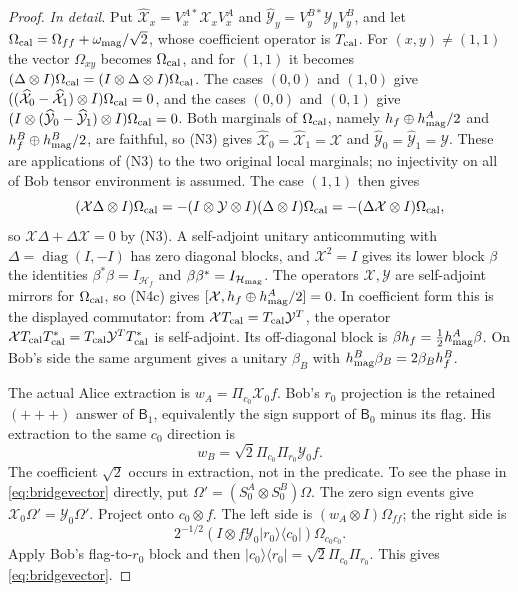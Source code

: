 \begin{proof}
\emph{In detail.} Put $\widehat{\mathcal X}_x=V^{A*}_x\mathcal X_xV^A_x$ and $\widehat{\mathcal Y}_y=V^{B*}_y\mathcal Y_yV^B_y$, and let $\Omega_{\rm cal}=\Omega_{ff}+\omega_{\rm mag}/\sqrt2$, whose coefficient operator is $T_{\rm cal}$. For $(x,y)\ne(1,1)$ the vector $\Omega_{xy}$ becomes $\Omega_{\rm cal}$, and for $(1,1)$ it becomes $(\Delta\otimes I)\Omega_{\rm cal}=(I\otimes\Delta\otimes I)\Omega_{\rm cal}$. The cases $(0,0)$ and $(1,0)$ give $((\widehat{\mathcal X}_0-\widehat{\mathcal X}_1)\otimes I)\Omega_{\rm cal}=0$, and the cases $(0,0)$ and $(0,1)$ give $(I\otimes(\widehat{\mathcal Y}_0-\widehat{\mathcal Y}_1)\otimes I)\Omega_{\rm cal}=0$. Both marginals of $\Omega_{\rm cal}$, namely $h_f\oplus h^A_{\rm mag}/2$ and $h^B_f\oplus h^B_{\rm mag}/2$, are faithful, so (N3) gives $\widehat{\mathcal X}_0=\widehat{\mathcal X}_1=\mathcal X$ and $\widehat{\mathcal Y}_0=\widehat{\mathcal Y}_1=\mathcal Y$. These are applications of (N3) to the two original local marginals;
no injectivity on all of Bob tensor environment is assumed. The case $(1,1)$ then gives
\[
 (\mathcal X\Delta\otimes I)\Omega_{\rm cal}=-(I\otimes\mathcal Y\otimes I)(\Delta\otimes I)\Omega_{\rm cal}
 =-(\Delta\mathcal X\otimes I)\Omega_{\rm cal},
\]
so $\mathcal X\Delta+\Delta\mathcal X=0$ by (N3). A self-adjoint unitary anticommuting with $\Delta=\operatorname{diag}(I,-I)$ has zero diagonal blocks, and $\mathcal X^2=I$ gives its lower block $\beta$ the identities $\beta^*\beta=I_{\mathcal H_f}$ and $\beta\beta^*=I_{\mathcal H_{\rm mag}}$. The operators $\mathcal X,\mathcal Y$ are self-adjoint mirrors for $\Omega_{\rm cal}$, so (N4c) gives $[\mathcal X,h_f\oplus h^A_{\rm mag}/2]=0$. In coefficient form this is the displayed commutator: from $\mathcal XT_{\rm cal}=T_{\rm cal}\mathcal Y^T$, the operator $\mathcal XT_{\rm cal}T_{\rm cal}^*=T_{\rm cal}\mathcal Y^TT_{\rm cal}^*$ is self-adjoint. Its off-diagonal block is $\beta h_f=\tfrac12h^A_{\rm mag}\beta$. On Bob's side the same argument gives a unitary $\beta_B$ with $h^B_{\rm mag}\beta_B=2\beta_Bh^B_f$.

The actual Alice extraction is $w_A=\Pi_{c_0}\mathcal X_0f$. Bob's $r_0$ projection is the retained $(+++)$ answer of $\mathsf B_1$, equivalently the sign support of $\mathsf B_0$ minus its flag. His extraction to the same $c_0$ direction is
\[
 w_B=\sqrt2\Pi_{c_0}\Pi_{r_0}\mathcal Y_0f.
\]
The coefficient $\sqrt2$ occurs in extraction, not in the predicate. To see the phase in \eqref{eq:bridgevector} directly, put $\Omega'=(S_0^A\otimes S_0^B)\Omega$. The zero sign events give $\mathcal X_0\Omega'=\mathcal Y_0\Omega'$. Project onto $c_0\otimes f$. The left side is $(w_A\otimes I)\Omega_{ff}$; the right side is
\[
 2^{-1/2}(I\otimes f\mathcal Y_0|r_0\rangle\langle c_0|)
       \Omega_{c_0c_0}.
\]
Apply Bob's flag-to-$r_0$ block and then $|c_0\rangle\langle r_0|=\sqrt2\Pi_{c_0}\Pi_{r_0}$. This gives \eqref{eq:bridgevector}.


\end{proof}
